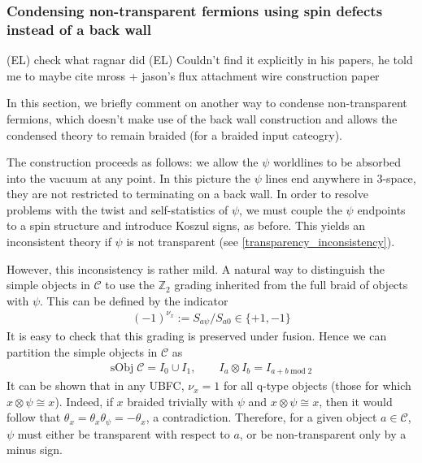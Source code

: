 \documentclass[12pt,a4paper]{article}
\newcommand{\tp}{\otimes}
\newcommand{\mcc}{\mathcal{C}}
\newcommand{\kw}[1]{{\color{kwcolor}\footnotesize{(KW) #1}}}
\newcommand{\ethan}[1]{{\color{amethyst}\footnotesize{(EL) #1}}}
\begin{document}
\subsubsection{Condensing non-transparent fermions using spin defects instead of a back wall} \label{spin_defects_condensation}

\ethan{check what ragnar did}
\ethan{Couldn't find it explicitly in his papers, he told me to maybe cite mross + jason's flux attachment wire construction paper}

In this section, we briefly comment on another way to condense non-transparent fermions, 
which doesn't make use of the back wall construction and allows the condensed theory to remain braided 
(for a braided input cateogry). 

The construction proceeds as follows: we allow the $\psi$ worldlines to be absorbed into the vacuum at any point.
In this picture the $\psi$ lines end anywhere in 3-space, they are not restricted to terminating on a back wall. 
In order to resolve problems with the twist and self-statistics of $\psi$, 
we must couple the $\psi$ endpoints to a spin structure and introduce Koszul signs, as before.
This yields an inconsistent theory if $\psi$ is not transparent (see \eqref{transparency_inconsistency}).

However, this inconsistency is rather mild. 
A natural way to distinguish the simple objects in $\mcc$ to use the $\mathbb{Z}_2$ 
grading inherited from the full braid of objects with $\psi$. 
This can be defined by the indicator 
\begin{align}
(-1)^{\nu_x} := S_{a \psi}/S_{a0} \in \{+1, -1 \}
\label{grading}
\end{align}
It is easy to check that this grading is preserved under fusion.
Hence we can partition the simple objects in $\mcc$ as 
\begin{align} \label{braiding_indicator}
\text{sObj}\; \mathcal{C}  = I_0 \cup I_1, \quad \quad I_a \tp I_b = I_{a+b\; \text{mod} \; 2}
\end{align}
It can be shown that in any UBFC, $\nu_x = 1$ for all q-type objects (those for which $x\tp \psi \cong x$).
Indeed, if $x$ braided trivially with $\psi$ and $x\tp \psi \cong x$, then it would follow that
$\theta_x = \theta_x \theta_\psi = -\theta_x$, a contradiction.
Therefore, for a given object $a\in\mcc$, $\psi$ must either be transparent with respect to $a$, or be non-transparent only by a minus sign. 
\end{document}
